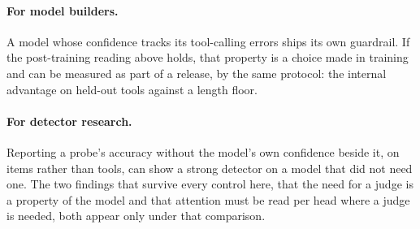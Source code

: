 \paragraph{For model builders.}
A model whose confidence tracks its tool-calling errors ships its own guardrail. If the post-training reading above holds, that property is a choice made in training and can be measured as part of a release, by the same protocol: the internal advantage on held-out tools against a length floor.

\paragraph{For detector research.}
Reporting a probe's accuracy without the model's own confidence beside it, on items rather than tools, can show a strong detector on a model that did not need one. The two findings that survive every control here, that the need for a judge is a property of the model and that attention must be read per head where a judge is needed, both appear only under that comparison.

